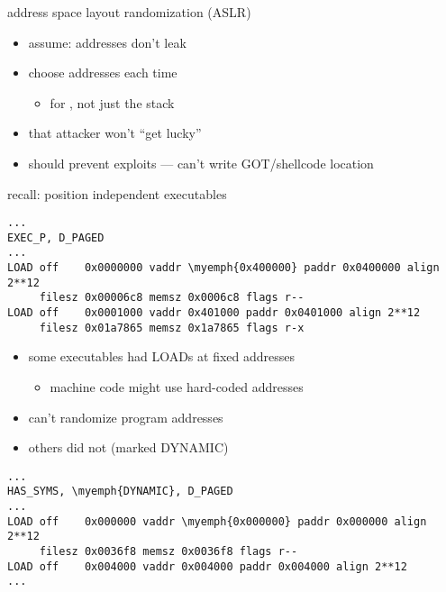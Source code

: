 
\begin{frame}{address space layout randomization (ASLR)}
    \begin{itemize}
    \item assume: addresses don't leak
    \item choose  addresses each time
        \begin{itemize}
        \item for , not just the stack
        \end{itemize}
    \item {} that attacker won't ``get lucky''
    \item should prevent exploits --- can't write GOT/shellcode location
    \end{itemize}
\end{frame}

\begin{frame}[fragile]{recall: position independent executables}
\begin{Verbatim}[fontsize=\fontsize{9}{10}\selectfont,commandchars=\\\{\}]
...
EXEC_P, D_PAGED
...
LOAD off    0x0000000 vaddr \myemph{0x400000} paddr 0x0400000 align 2**12
     filesz 0x00006c8 memsz 0x0006c8 flags r--
LOAD off    0x0001000 vaddr 0x401000 paddr 0x0401000 align 2**12
     filesz 0x01a7865 memsz 0x1a7865 flags r-x
\end{Verbatim}
    \begin{itemize}
    \item some executables had LOADs at fixed addresses
        \begin{itemize}
        \item machine code might use hard-coded addresses
        \end{itemize}
    \item can't randomize program addresses
    \item others did not (marked DYNAMIC)
    \end{itemize}
\begin{Verbatim}[fontsize=\fontsize{9}{10}\selectfont,commandchars=\\\{\}]
...
HAS_SYMS, \myemph{DYNAMIC}, D_PAGED
...
LOAD off    0x000000 vaddr \myemph{0x000000} paddr 0x000000 align 2**12
     filesz 0x0036f8 memsz 0x0036f8 flags r--
LOAD off    0x004000 vaddr 0x004000 paddr 0x004000 align 2**12
...
\end{Verbatim}
\end{frame}
